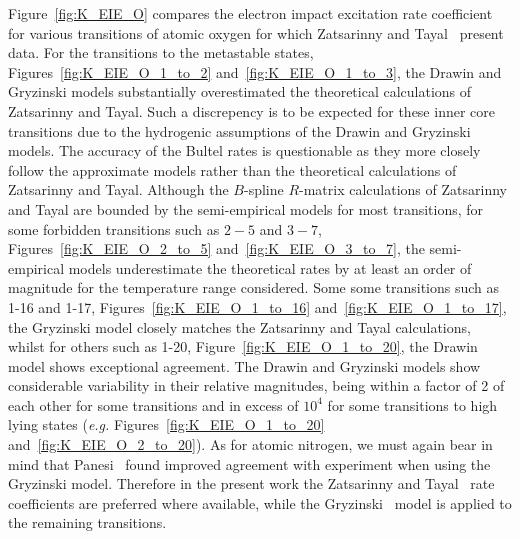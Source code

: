 {Figure~\ref{fig:K_EIE_O} compares the electron impact excitation rate coefficient for various transitions of atomic oxygen for which Zatsarinny and Tayal~\cite{ZT2003} present data.
For the transitions to the metastable states, Figures~\ref{fig:K_EIE_O_1_to_2} and~\ref{fig:K_EIE_O_1_to_3}, the Drawin and Gryzinski models substantially overestimated the theoretical calculations of Zatsarinny and Tayal.
Such a discrepency is to be expected for these inner core transitions due to the hydrogenic assumptions of the Drawin and Gryzinski models.
The accuracy of the Bultel rates is questionable as they more closely follow the approximate models rather than the theoretical calculations of Zatsarinny and Tayal.
Although the $B$-spline $R$-matrix calculations of Zatsarinny and Tayal are bounded by the semi-empirical models for most transitions, for some forbidden transitions such as $2-5$ and $3-7$, Figures~\ref{fig:K_EIE_O_2_to_5} and~\ref{fig:K_EIE_O_3_to_7}, the semi-empirical models underestimate the theoretical rates by at least an order of magnitude for the temperature range considered.
Some some transitions such as 1-16 and 1-17, Figures~\ref{fig:K_EIE_O_1_to_16} and~\ref{fig:K_EIE_O_1_to_17}, the Gryzinski model closely matches the Zatsarinny and Tayal calculations, whilst for others such as 1-20, Figure~\ref{fig:K_EIE_O_1_to_20}, the Drawin model shows exceptional agreement.
The Drawin and Gryzinski models show considerable variability in their relative magnitudes, being within a factor of 2 of each other for some transitions and in excess of $10^4$ for some transitions to high lying states (\textit{e.g.} Figures~\ref{fig:K_EIE_O_1_to_20} and~\ref{fig:K_EIE_O_2_to_20}).
As for atomic nitrogen, we must again bear in mind that Panesi~\cite{panesi_2008B,panesi_phd} found improved agreement with experiment when using the Gryzinski model.
Therefore in the present work the Zatsarinny and Tayal~\cite{ZT2003} rate coefficients are preferred where available, while the Gryzinski~\cite{Gryz59} model is applied to the remaining transitions.

}
